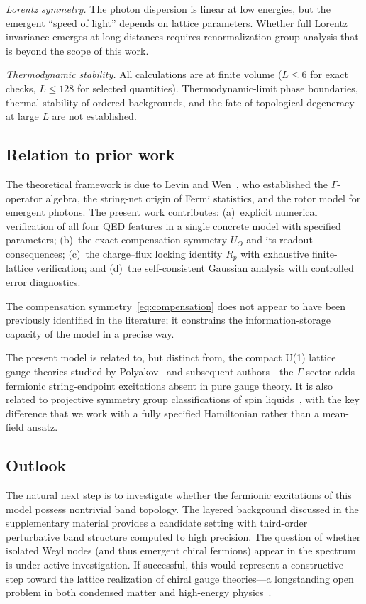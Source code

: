 \documentclass[aps,prb,twocolumn,superscriptaddress,showpacs]{revtex4-2}
\begin{document}
\textit{Lorentz symmetry.} The photon dispersion is linear at low
energies, but the emergent ``speed of light'' depends on lattice
parameters. Whether full Lorentz invariance emerges at long distances
requires renormalization group analysis that is beyond the scope of this
work.

\textit{Thermodynamic stability.} All calculations are at finite
volume ($L\leq 6$ for exact checks, $L\leq 128$ for selected
quantities). Thermodynamic-limit phase boundaries, thermal stability
of ordered backgrounds, and the fate of topological degeneracy at
large $L$ are not established.

\subsection{Relation to prior work}

The theoretical framework is due to Levin and
Wen~\cite{levin2003,levin2006}, who established the $\Gamma$-operator
algebra, the string-net origin of Fermi statistics, and the rotor model
for emergent photons. The present work contributes: (a)~explicit numerical
verification of all four QED features in a single concrete model with
specified parameters; (b)~the exact compensation symmetry $U_O$ and its
readout consequences; (c)~the charge--flux locking identity $R_p$ with
exhaustive finite-lattice verification; and (d)~the self-consistent
Gaussian analysis with controlled error diagnostics.

The compensation symmetry~\eqref{eq:compensation} does not appear to
have been previously identified in the literature; it constrains the
information-storage capacity of the model in a precise way.

The present model is related to, but distinct from, the compact U(1)
lattice gauge theories studied by Polyakov~\cite{polyakov1977} and
subsequent authors---the $\Gamma$ sector adds fermionic string-endpoint
excitations absent in pure gauge theory. It is also related to
projective symmetry group classifications of spin
liquids~\cite{wen2003order}, with the key difference that we work with
a fully specified Hamiltonian rather than a mean-field ansatz.

\subsection{Outlook}

The natural next step is to investigate whether the fermionic
excitations of this model possess nontrivial band topology. The
layered background discussed in the supplementary material provides
a candidate setting with third-order perturbative band structure
computed to high precision. The question of whether isolated Weyl
nodes (and thus emergent chiral fermions) appear in the spectrum
is under active investigation. If successful, this would represent
a constructive step toward the lattice realization of chiral gauge
theories---a longstanding open problem in both condensed matter and
high-energy physics~\cite{wang2020,nielsen1981a}.
\end{document}
